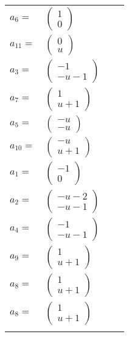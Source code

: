 \documentclass[1p]{elsarticle_modified}
\theoremstyle{definition}
\begin{document}
\begin{tabular}{m{7pt} m{180pt} m{7pt} m{180pt} }
\flushright $a_{6}=$&$\begin{pmatrix}1\\0\end{pmatrix}$ \\
\flushright $a_{11}=$&$\begin{pmatrix}0\\u\end{pmatrix}$ \\
\flushright $a_{3}=$&$\begin{pmatrix}-1\\- u-1\end{pmatrix}$ \\
\flushright $a_{7}=$&$\begin{pmatrix}1\\u+1\end{pmatrix}$ \\
\flushright $a_{5}=$&$\begin{pmatrix}- u\\- u\end{pmatrix}$ \\
\flushright $a_{10}=$&$\begin{pmatrix}- u\\u+1\end{pmatrix}$ \\
\flushright $a_{1}=$&$\begin{pmatrix}-1\\0\end{pmatrix}$ \\
\flushright $a_{2}=$&$\begin{pmatrix}- u-2\\- u-1\end{pmatrix}$ \\
\flushright $a_{4}=$&$\begin{pmatrix}-1\\- u-1\end{pmatrix}$ \\
\flushright $a_{9}=$&$\begin{pmatrix}1\\u+1\end{pmatrix}$ \\
\flushright $a_{8}=$&$\begin{pmatrix}1\\u+1\end{pmatrix}$\\ \flushright $a_{8}=$&$\begin{pmatrix}1\\u+1\end{pmatrix}$\\&\end{tabular}
\end{document}
